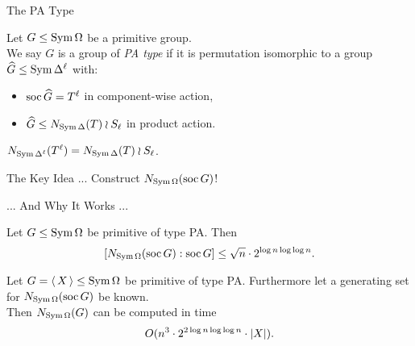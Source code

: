 \begin{frame}{The PA Type}
    \begin{defn}
        Let $G \leq \operatorname{Sym} \Omega$ be a primitive group.
        \\
        We say $G$ is a group of \emph{PA type} if it is permutation
        isomorphic to a group $\widehat{G} \leq \operatorname{Sym} \Delta ^ \ell$ with:
        \vspace{-0.5em}
        \pause
        \begin{itemize}
            \item
            $\operatorname{soc} \widehat{G} = T ^ \ell$ in component-wise action,
            \pause
            \item
            $\widehat{G} \leq N_{\operatorname{Sym} \Delta}(T) \wr S_\ell$ in product action.
        \end{itemize}
    \end{defn}
    \pause

    \begin{lemma}
        $N_{\operatorname{Sym} \Delta ^ \ell}( T ^ \ell ) = N_{\operatorname{Sym} \Delta}(T) \wr S_\ell$.
    \end{lemma}
\end{frame}


\begin{frame}{The Key Idea ...}
    \centering
    {\Large
    Construct $N_{\operatorname{Sym} \Omega}(\operatorname{soc} G)$!
    }
\end{frame}

\begin{frame}{... And Why It Works ...}
    \begin{lemma}
        Let $G \leq \operatorname{Sym} \Omega$ be primitive of type PA.
        Then
        \vspace{-0.5em}
        \[
            [ N_{\operatorname{Sym} \Omega}(\operatorname{soc} G) : \operatorname{soc} G ]
            \leq \sqrt n \cdot 2 ^ {\log n \log \log n}.
        \]
    \end{lemma}
    \pause

    \begin{lemma}
        Let $G =  \left\langle \, X \, \right\rangle  \leq \operatorname{Sym} \Omega$ be primitive of type PA.
        Furthermore let a generating set for
        $N_{\operatorname{Sym} \Omega}(\operatorname{soc} G)$ be known.
        \\
        \pause
        Then $N_{\operatorname{Sym} \Omega}(G)$ can be computed in time
        \vspace{-0.5em}
        \[
            O(n ^ 3 \cdot 2 ^ {2 \log n \log \log n} \cdot  \left| X \right| ).
        \]
    \end{lemma}
\end{frame}

